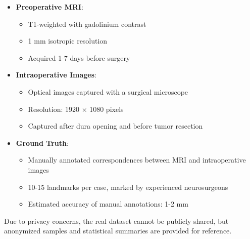\begin{itemize}
    \item \textbf{Preoperative MRI}:
    \begin{itemize}
        \item T1-weighted with gadolinium contrast
        \item 1 mm isotropic resolution
        \item Acquired 1-7 days before surgery
    \end{itemize}
    
    \item \textbf{Intraoperative Images}:
    \begin{itemize}
        \item Optical images captured with a surgical microscope
        \item Resolution: 1920 × 1080 pixels
        \item Captured after dura opening and before tumor resection
    \end{itemize}
    
    \item \textbf{Ground Truth}:
    \begin{itemize}
        \item Manually annotated correspondences between MRI and intraoperative images
        \item 10-15 landmarks per case, marked by experienced neurosurgeons
        \item Estimated accuracy of manual annotations: 1-2 mm
    \end{itemize}
\end{itemize}

Due to privacy concerns, the real dataset cannot be publicly shared, but anonymized samples and statistical summaries are provided for reference. 